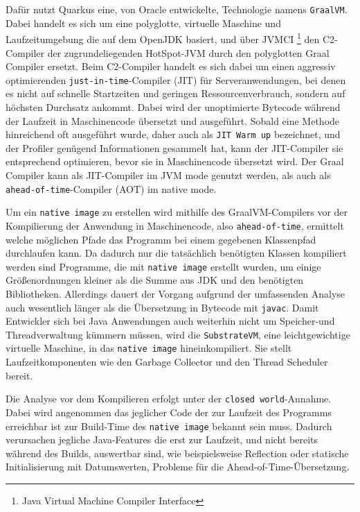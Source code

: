 Dafür nutzt Quarkus eine, von Oracle entwickelte, Technologie namens \verb|GraalVM|.
Dabei handelt es sich um eine polyglotte, virtuelle Maschine und Laufzeitumgebung die auf dem OpenJDK basiert, und über
JVMCI \footnote{Java Virtual Machine Compiler Interface} den C2-Compiler der zugrundeliegenden HotSpot-JVM durch den
polyglotten Graal Compiler ersetzt.\parencite{GraalVM}
Beim C2-Compiler handelt es sich dabei um einen aggressiv optimierenden \verb|just-in-time|-Compiler (JIT) für Serveranwendungen, bei denen es nicht auf
schnelle Startzeiten und geringen Ressourcenverbrauch, sondern auf höchsten Durchsatz ankommt.
Dabei wird der unoptimierte Bytecode während der Laufzeit in Maschinencode übersetzt und ausgeführt. Sobald eine Methode hinreichend oft
ausgeführt wurde, daher auch als \verb|JIT Warm up| bezeichnet, und der Profiler genügend Informationen gesammelt hat, kann der JIT-Compiler
sie entsprechend optimieren, bevor sie in Maschinencode übersetzt wird.
Der Graal Compiler kann als JIT-Compiler im JVM mode genutzt werden, als auch als \verb|ahead-of-time|-Compiler (AOT) im native mode.\newline

Um ein \verb|native image| zu erstellen wird mithilfe des GraalVM-Compilers vor der Kompilierung der Anwendung in Maschinencode, also \verb|ahead-of-time|,
ermittelt welche möglichen Pfade das Programm bei einem gegebenen Klassenpfad durchlaufen kann. Da dadurch nur die tatsächlich benötigten Klassen
kompiliert werden sind Programme, die mit \verb|native image| erstellt wurden, um einige Größenordnungen kleiner als die Summe aus
JDK und den benötigten Bibliotheken.
Allerdings dauert der Vorgang aufgrund der umfassenden Analyse auch wesentlich länger als die Übersetzung in Bytecode mit \verb|javac|.
Damit Entwickler sich bei Java Anwendungen auch weiterhin nicht um Speicher-und Threadverwaltung kümmern müssen, wird die \verb|SubstrateVM|, eine
leichtgewichtige virtuelle Maschine, in das \verb|native image| hineinkompiliert.
Sie stellt Laufzeitkomponenten wie den Garbage Collector und den Thread Scheduler bereit.

Die Analyse vor dem Kompilieren erfolgt unter der \verb|closed world|-Annahme. Dabei wird angenommen das jeglicher Code der zur Laufzeit des Programms
erreichbar ist zur Build-Time des \verb|native image| bekannt sein muss. Dadurch verursachen jegliche Java-Features die erst zur Laufzeit,
und nicht bereits während des Builds,
auswertbar sind, wie beispielsweise Reflection oder statische Initialisierung mit Datumswerten, Probleme für die Ahead-of-Time-Übersetzung.

